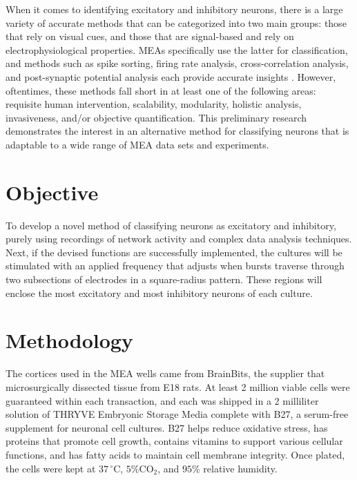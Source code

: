 \documentclass{article} %
\begin{document}
When it comes to identifying excitatory and inhibitory neurons, there is a large variety of accurate methods that can be categorized into two main groups: those that rely on visual cues, and those that are signal-based and rely on electrophysiological properties. MEAs specifically use the latter for classification, and methods such as spike sorting, firing rate analysis, cross-correlation analysis, and post-synaptic potential analysis each provide accurate insights \parencite{Quiroga2004-kd, Buzsaki2014-ta, Perkel1967-wa, Stuart1997-ho}. However, oftentimes, these methods fall short in at least one of the following areas: requisite human intervention, scalability, modularity, holistic analysis, invasiveness, and/or objective quantification. This preliminary research demonstrates the interest in an alternative method for classifying neurons that is adaptable to a wide range of MEA data sets and experiments.

\section{Objective}
To develop a novel method of classifying neurons as excitatory and inhibitory, purely using recordings of network activity and complex data analysis techniques. Next, if the devised functions are successfully implemented, the cultures will be stimulated with an applied frequency that adjusts when bursts traverse through two subsections of electrodes in a square-radius pattern. These regions will enclose the most excitatory and most inhibitory neurons of each culture. 



\section{Methodology}
The cortices used in the MEA wells came from BrainBits, the supplier that microsurgically dissected tissue from E18 rats. At least 2 million viable cells were guaranteed within each transaction, and each was shipped in a 2 milliliter solution of THRYVE Embryonic Storage Media complete with B27, a serum-free supplement for neuronal cell cultures. B27 helps reduce oxidative stress, has proteins that promote cell growth, contains vitamins to support various cellular functions, and has fatty acids to maintain cell membrane integrity. Once plated, the cells were kept at \(37\,^{\circ}\mathrm{C}\), \(5\% \mathrm{CO}_2\), and \(95\%\) relative humidity.
\end{document}

